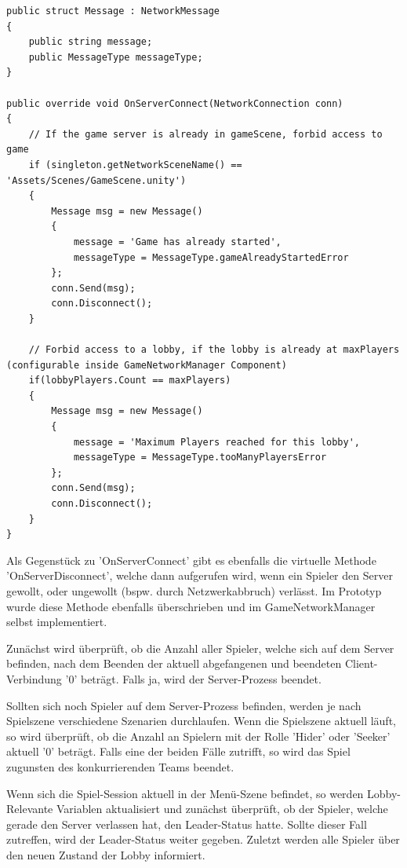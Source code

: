 \begin{lstlisting}[caption= GameNetworkManager.cs OnServerConnect() und Message struct]
public struct Message : NetworkMessage
{
	public string message;
	public MessageType messageType;
}
	
public override void OnServerConnect(NetworkConnection conn)
{
	// If the game server is already in gameScene, forbid access to game
	if (singleton.getNetworkSceneName() == 'Assets/Scenes/GameScene.unity')
	{
		Message msg = new Message()
		{
			message = 'Game has already started',
			messageType = MessageType.gameAlreadyStartedError
		};
		conn.Send(msg);
		conn.Disconnect();
	}
	
	// Forbid access to a lobby, if the lobby is already at maxPlayers (configurable inside GameNetworkManager Component)
	if(lobbyPlayers.Count == maxPlayers)
	{
		Message msg = new Message()
		{
			message = 'Maximum Players reached for this lobby',
			messageType = MessageType.tooManyPlayersError
		};
		conn.Send(msg);
		conn.Disconnect();
	}
}
\end{lstlisting}

Als Gegenstück zu 'OnServerConnect' gibt es ebenfalls die virtuelle Methode 'OnServerDisconnect', welche dann aufgerufen wird, wenn ein Spieler den Server gewollt, oder ungewollt (bspw. durch Netzwerkabbruch) verlässt. Im Prototyp wurde diese Methode ebenfalls überschrieben und im GameNetworkManager selbst implementiert. 

Zunächst wird überprüft, ob die Anzahl aller Spieler, welche sich auf dem Server befinden, nach dem Beenden der aktuell abgefangenen und beendeten Client-Verbindung '0' beträgt. Falls ja, wird der Server-Prozess beendet. 

Sollten sich noch Spieler auf dem Server-Prozess befinden, werden je nach Spielszene verschiedene Szenarien durchlaufen. Wenn die Spielszene aktuell läuft, so wird überprüft, ob die Anzahl an Spielern mit der Rolle 'Hider' oder 'Seeker' aktuell '0' beträgt. Falls eine der beiden Fälle zutrifft, so wird das Spiel zugunsten des konkurrierenden Teams beendet.

Wenn sich die Spiel-Session aktuell in der Menü-Szene befindet, so werden Lobby-Relevante Variablen aktualisiert und zunächst überprüft, ob der Spieler, welche gerade den Server verlassen hat, den Leader-Status hatte. Sollte dieser Fall zutreffen, wird der Leader-Status weiter gegeben. Zuletzt werden alle Spieler über den neuen Zustand der Lobby informiert.

